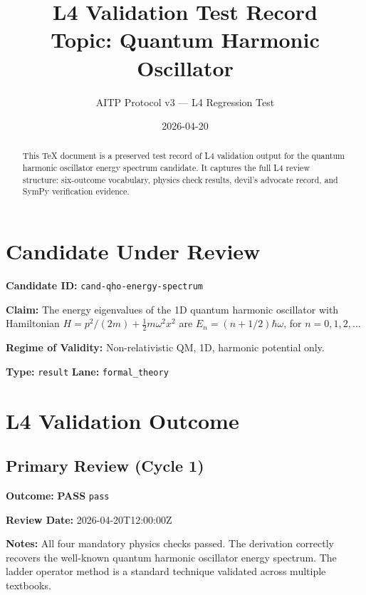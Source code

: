\documentclass[11pt,a4paper]{article}
\title{\textbf{L4 Validation Test Record}\\[0.4em]
  \large Topic: Quantum Harmonic Oscillator}
\author{AITP Protocol v3 — L4 Regression Test}
\date{2026-04-20}
\newcommand{\statuspass}{\textcolor{passgreen}{\textbf{PASS}}}
\begin{document}
\maketitle

\begin{abstract}
This TeX document is a preserved test record of L4 validation output for the
quantum harmonic oscillator energy spectrum candidate. It captures the full
L4 review structure: six-outcome vocabulary, physics check results, devil's
advocate record, and SymPy verification evidence.
\end{abstract}

\tableofcontents
\newpage


\section{Candidate Under Review}

\begin{resultbox}
\textbf{Candidate ID:} \texttt{cand-qho-energy-spectrum}

\textbf{Claim:} The energy eigenvalues of the 1D quantum harmonic oscillator
with Hamiltonian $H = p^2/(2m) + \frac{1}{2} m \omega^2 x^2$ are
$E_n = (n + 1/2) \hbar \omega$, for $n = 0, 1, 2, \ldots$

\textbf{Regime of Validity:} Non-relativistic QM, 1D, harmonic potential only.

\textbf{Type:} \texttt{result} \quad
\textbf{Lane:} \texttt{formal\_theory}
\end{resultbox}


\section{L4 Validation Outcome}

\subsection{Primary Review (Cycle 1)}

\begin{valbox}
\textbf{Outcome:} \statuspass{} \texttt{pass}

\textbf{Review Date:} 2026-04-20T12:00:00Z

\textbf{Notes:} All four mandatory physics checks passed. The derivation
correctly recovers the well-known quantum harmonic oscillator energy spectrum.
The ladder operator method is a standard technique validated across multiple
textbooks.
\end{valbox}
\end{document}
